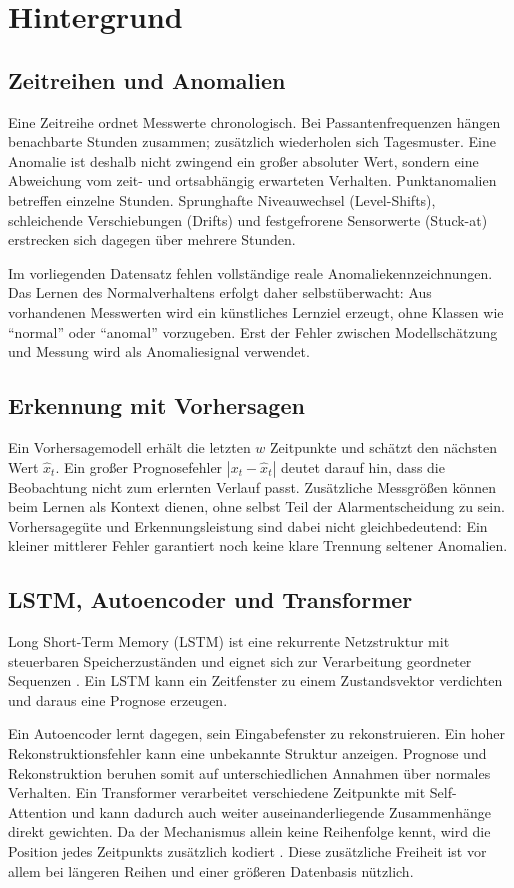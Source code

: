 \chapter{Hintergrund}
\label{ch:Hintergrund}

\section{Zeitreihen und Anomalien}

Eine Zeitreihe ordnet Messwerte chronologisch. Bei Passantenfrequenzen hängen
benachbarte Stunden zusammen; zusätzlich wiederholen sich Tagesmuster. Eine
Anomalie ist deshalb nicht zwingend ein großer absoluter Wert, sondern eine
Abweichung vom zeit- und ortsabhängig erwarteten Verhalten. Punktanomalien
betreffen einzelne Stunden. Sprunghafte Niveauwechsel (Level-Shifts),
schleichende Verschiebungen (Drifts) und festgefrorene Sensorwerte (Stuck-at)
erstrecken sich dagegen über mehrere Stunden.

Im vorliegenden Datensatz fehlen vollständige reale Anomaliekennzeichnungen.
Das Lernen des Normalverhaltens erfolgt daher selbstüberwacht: Aus vorhandenen
Messwerten wird ein künstliches Lernziel erzeugt, ohne Klassen wie ``normal'' oder
``anomal'' vorzugeben. Erst der Fehler zwischen Modellschätzung und Messung wird
als Anomaliesignal verwendet.

\section{Erkennung mit Vorhersagen}

Ein Vorhersagemodell erhält die letzten $w$ Zeitpunkte und schätzt den nächsten
Wert $\hat{x}_t$. Ein großer Prognosefehler $|x_t-\hat{x}_t|$ deutet darauf hin,
dass die Beobachtung nicht zum erlernten Verlauf passt. Zusätzliche Messgrößen
können beim Lernen als Kontext dienen, ohne selbst Teil der Alarmentscheidung
zu sein. Vorhersagegüte und Erkennungsleistung sind
dabei nicht gleichbedeutend: Ein kleiner mittlerer Fehler garantiert noch keine klare Trennung seltener
Anomalien.

\section{LSTM, Autoencoder und Transformer}

Long Short-Term Memory (LSTM) ist eine rekurrente Netzstruktur mit steuerbaren
Speicherzuständen und eignet sich zur Verarbeitung geordneter Sequenzen
\cite{hochreiter1997long}. Ein LSTM kann ein Zeitfenster zu einem
Zustandsvektor verdichten und daraus eine Prognose erzeugen.

Ein Autoencoder lernt dagegen, sein Eingabefenster zu rekonstruieren. Ein hoher
Rekonstruktionsfehler kann eine unbekannte Struktur anzeigen. Prognose und
Rekonstruktion beruhen somit auf unterschiedlichen Annahmen über normales
Verhalten. Ein Transformer verarbeitet verschiedene Zeitpunkte mit
Self-Attention und kann dadurch auch weiter auseinanderliegende Zusammenhänge
direkt gewichten. Da der Mechanismus allein keine Reihenfolge kennt, wird die
Position jedes Zeitpunkts zusätzlich kodiert
\cite{vaswani2017attention}. Diese zusätzliche Freiheit ist vor allem bei
längeren Reihen und einer größeren Datenbasis nützlich.
